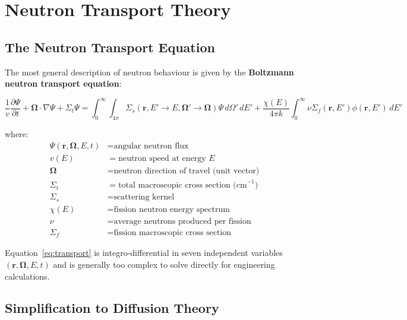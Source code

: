 \documentclass[12pt,a4paper]{article}
\newcommand{\pd}[2]{\frac{\partial #1}{\partial #2}}
\begin{document}
\section{Neutron Transport Theory}

\subsection{The Neutron Transport Equation}

The most general description of neutron behaviour is given by the
\textbf{Boltzmann neutron transport equation}:

\begin{eqbox}
\begin{equation}
\frac{1}{v}\pd{\Psi}{t} + \bm{\Omega}\cdot\nabla\Psi + \Sigma_t\Psi
 = \int_0^\infty\int_{4\pi} \Sigma_s(\mathbf{r}, E'\to E, \bm{\Omega}'\to\bm{\Omega})
  \Psi\,d\Omega'\,dE'+ \frac{\chi(E)}{4\pi k}\int_0^\infty \nu\Sigma_f(\mathbf{r},E')\phi(\mathbf{r},E')\,dE'
\label{eq:transport}
\end{equation}
\end{eqbox}

where:
\begin{align*}
  \Psi(\mathbf{r}, \bm{\Omega}, E, t) &= \text{angular neutron flux} \\
  v(E)         &= \text{neutron speed at energy } E \\
  \bm{\Omega}  &= \text{neutron direction of travel (unit vector)} \\
  \Sigma_t     &= \text{total macroscopic cross section (cm}^{-1}) \\
  \Sigma_s     &= \text{scattering kernel} \\
  \chi(E)      &= \text{fission neutron energy spectrum} \\
  \nu          &= \text{average neutrons produced per fission} \\
  \Sigma_f     &= \text{fission macroscopic cross section}
\end{align*}

Equation~\eqref{eq:transport} is integro-differential in seven independent
variables $(\mathbf{r}, \bm{\Omega}, E, t)$ and is generally too complex to
solve directly for engineering calculations.

\subsection{Simplification to Diffusion Theory}
\end{document}

